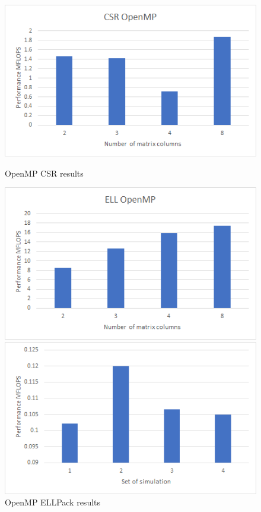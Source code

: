 \documentclass{scrreprt}
\begin{document}
\begin{figure}[ht] 
  \label{ fig7} 
  \begin{minipage}[b]{0.5\linewidth}
    \centering
    \includegraphics[width=.9\linewidth]{cage4CSRMP.png} 
    \caption{OpenMP CSR results} 
    \vspace{4ex}
  \end{minipage}%
  \begin{minipage}[b]{0.5\linewidth}
    \centering
    \includegraphics[width=.9\linewidth]{cage4EllMP.png} 
    \caption{OpenMP ELLPack results} 
    \vspace{4ex}
  \end{minipage} 
  \begin{minipage}[b]{0.5\linewidth}
    \centering
    \includegraphics[width=.9\linewidth]{cage4CSRCUDA.png} 

\end{minipage}
\end{figure}
\end{document}
